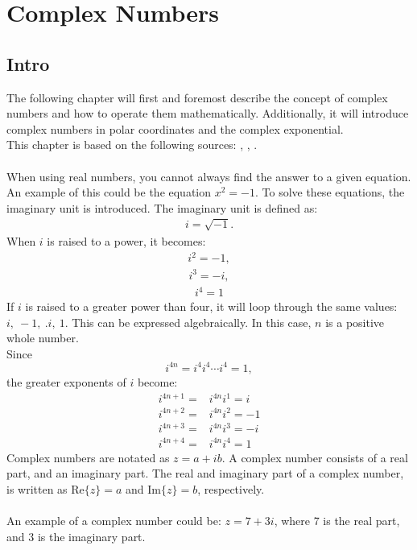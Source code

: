 \chapter{Complex Numbers}

\section{Intro}
The following chapter will first and foremost describe the concept of complex numbers and how to operate them mathematically. Additionally, it will introduce complex numbers in polar coordinates and the complex exponential.
\\
This chapter is based on the following sources: \cite{complexpaul}, \cite{complexpurple}, \cite{complexnotebook}.
\\
\\
When using real numbers, you cannot always find the answer to a given equation. An example of this could be the equation $x^2=-1$. To solve these equations, the imaginary unit is introduced. The imaginary unit is defined as:
\begin{align*}
i=\sqrt{-1}.
\end{align*}
When $i$ is raised to a power, it becomes:
\begin{align*}
i^2=-1,
\end{align*}
\begin{align*}
i^3=-i,
\end{align*}
\begin{align*}
i^4=1
\end{align*}
If $i$ is raised to a greater power than four, it will loop through the same values: $i, \ -1, \ .i, \ 1$. This can be expressed algebraically. In this case, $n$ is a  positive whole number. 
\\
Since $$i^{4n} = i^4i^4\cdots i^4 = 1,$$
the greater exponents of $i$ become:
\begin{align*}
	i^{4n+1} =& i^{4n}i^1 = i \\
	i^{4n+2} =& i^{4n}i^2 = -1 \\
	i^{4n+3} =& i^{4n}i^3 = -i \\
	i^{4n+4} =& i^{4n}i^4 = 1
\end{align*}
Complex numbers are notated as $z = a+ib$. A complex number consists of a real part, and an imaginary part. The real and imaginary part of a complex number, is written as $\text{Re}\{z\}=a$ and $\text{Im}\{z\}=b$, respectively.
\\
\\
An example of a complex number could be: $z=7+3i$, where 7 is the real part, and 3 is the imaginary part. 
